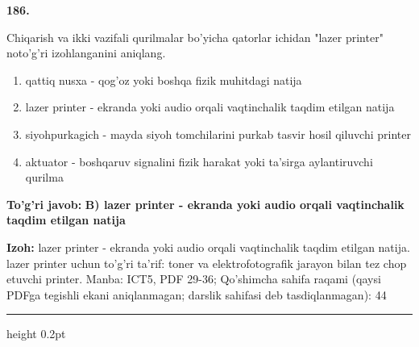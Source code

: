 \documentclass[10pt,a4paper]{article}
\begin{document}
{\bfseries\sffamily\color{ink} 186.}
\par
Chiqarish va ikki vazifali qurilmalar bo'yicha qatorlar ichidan "lazer printer" noto'g'ri izohlanganini aniqlang.
\begin{enumerate}[label=\Alph*),leftmargin=9mm]
\item qattiq nusxa - qog'oz yoki boshqa fizik muhitdagi natija
\item lazer printer - ekranda yoki audio orqali vaqtinchalik taqdim etilgan natija
\item siyohpurkagich - mayda siyoh tomchilarini purkab tasvir hosil qiluvchi printer
\item aktuator - boshqaruv signalini fizik harakat yoki ta'sirga aylantiruvchi qurilma
\end{enumerate}
\begin{tcolorbox}[enhanced,breakable,colback=teal!4,colframe=teal!60!black,boxrule=0.45pt,arc=1.2mm,left=2.7mm,right=2.7mm,top=1.8mm,bottom=1.8mm,before skip=2mm,after skip=2mm]
{\bfseries\sffamily\color{teal}To'g'ri javob:} \textbf{B) lazer printer - ekranda yoki audio orqali vaqtinchalik taqdim etilgan natija}
\par\smallskip
{\bfseries Izoh:} lazer printer - ekranda yoki audio orqali vaqtinchalik taqdim etilgan natija. lazer printer uchun to'g'ri ta'rif: toner va elektrofotografik jarayon bilan tez chop etuvchi printer. Manba: ICT5, PDF 29-36; Qo'shimcha sahifa raqami (qaysi PDFga tegishli ekani aniqlanmagan; darslik sahifasi deb tasdiqlanmagan): 44
\end{tcolorbox}
\vspace{2mm}\hrule height 0.2pt\vspace{3mm}
\end{document}
